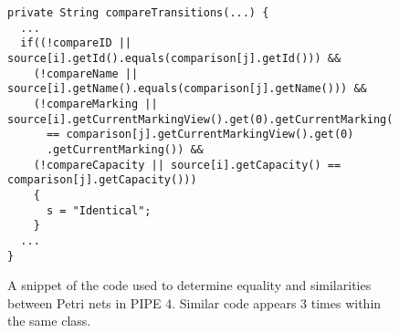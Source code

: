 \begin{figure}[H]
\begin{center}
\begin{lstlisting}[frame=single]
private String compareTransitions(...) {
  ...
  if((!compareID || source[i].getId().equals(comparison[j].getId())) &&
    (!compareName || source[i].getName().equals(comparison[j].getName())) &&
    (!compareMarking || source[i].getCurrentMarkingView().get(0).getCurrentMarking()
      == comparison[j].getCurrentMarkingView().get(0)
      .getCurrentMarking()) &&
    (!compareCapacity || source[i].getCapacity() == comparison[j].getCapacity()))
    {
      s = "Identical";
    }
  ...
}
\end{lstlisting}
  
\caption{A snippet of the code used to determine equality and similarities between
            Petri nets in PIPE 4. Similar code appears 3 times within the same class.}
\label{lst:identical}
\end{center}
\end{figure}